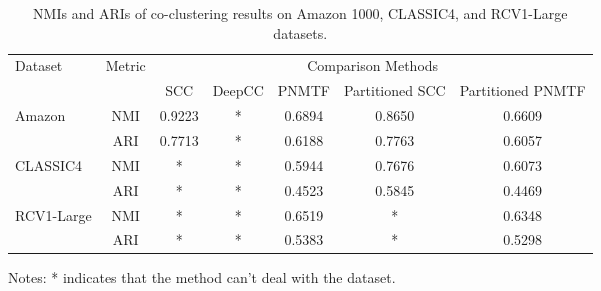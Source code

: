 \documentclass{beamer}
\begin{document}
\begin{frame}
  \begin{table}[htbp]
    \centering
    \caption{NMIs and ARIs of co-clustering results on Amazon 1000, CLASSIC4, and RCV1-Large datasets.}
    \begin{tabular}{@{} l c ccccc @{}}
      \toprule
      \multirow{2}{*}{Dataset}    & \multirow{2}{*}{Metric} & \multicolumn{5}{c}{Comparison Methods}                                                         \\
      \cmidrule{3-7}
                                  &                         & SCC                                    & DeepCC & PNMTF  & Partitioned SCC & Partitioned PNMTF \\
      \midrule
      \multirow{2}{*}{Amazon}     & NMI                     & 0.9223                                 & *      & 0.6894 & 0.8650          & 0.6609            \\
                                  & ARI                     & 0.7713                                 & *      & 0.6188 & 0.7763          & 0.6057            \\
      \multirow{2}{*}{CLASSIC4}   & NMI                     & *                                      & *      & 0.5944 & 0.7676          & 0.6073            \\
                                  & ARI                     & *                                      & *      & 0.4523 & 0.5845          & 0.4469            \\
      \multirow{2}{*}{RCV1-Large} & NMI                     & *                                      & *      & 0.6519 & *               & 0.6348            \\
                                  & ARI                     & *                                      & *      & 0.5383 & *               & 0.5298            \\
      \bottomrule
    \end{tabular}
    \begin{tablenotes}
      \item Notes: * indicates that the method can't deal with the dataset.
    \end{tablenotes}
  \end{table}
\end{frame}
\end{document}
